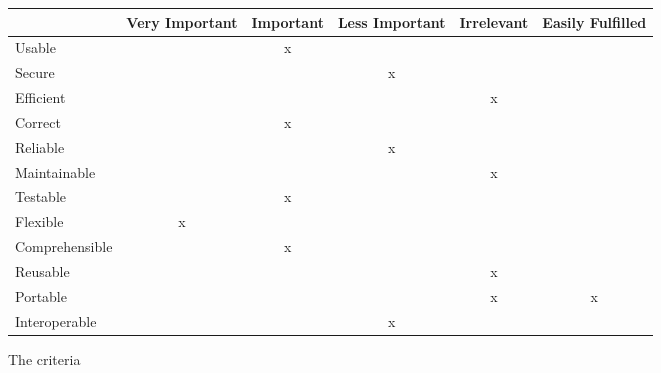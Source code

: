 \begin{figure}[htbp]
	\centering
		\begin{tabular}{| l | m{} | m{}| m{}| m{}|m{}|} \hline
		  & Very  Important & Important & Less Important & Irrelevant & Easily Fulfilled \\ \hline
		Usable  & & \multicolumn{1}{c|}{x} & & & \\ \hline
		Secure  & & & \multicolumn{1}{c|}{x} & & \\ \hline
		Efficient & & & & \multicolumn{1}{c|}{x} & \\ \hline
		Correct  & & \multicolumn{1}{c|}{x} & & & \\ \hline
		Reliable  & & & \multicolumn{1}{c|}{x} & & \\ \hline
		Maintainable  & & & & \multicolumn{1}{c|}{x} & \\ \hline
		Testable  & & \multicolumn{1}{c|}{x} & & & \\ \hline
		Flexible  & \multicolumn{1}{c|}{x} & & & & \\ \hline
		Comprehensible  & & \multicolumn{1}{c|}{x} & & & \\ \hline
		Reusable  & & & & \multicolumn{1}{c|}{x} & \\ \hline
		Portable & & & & \multicolumn{1}{c|}{x} & \multicolumn{1}{c|}{x} \\ \hline
		Interoperable & & & \multicolumn{1}{c|}{x} & & \\ \hline
		\end{tabular}
	\caption{The criteria}
	\label{fig:prioritizedCrit}
\end{figure}

